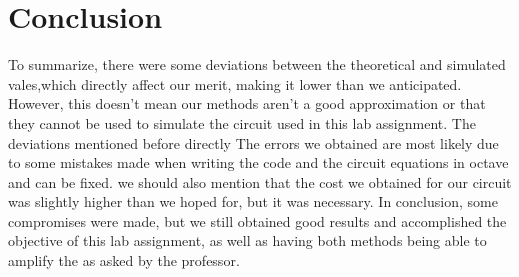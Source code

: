 \section{Conclusion}
\label{sec:conclusion}
To summarize, there were some deviations between the theoretical and simulated vales,which directly affect our merit, making it lower than we anticipated. However, this doesn't mean our methods aren't a good approximation or that they cannot be used to simulate the circuit used in this lab assignment. The deviations mentioned before directly The errors we obtained are most likely due to some mistakes made when writing the code and the circuit equations in octave and can be fixed.
we should also mention that the cost we obtained for our circuit was slightly higher than we hoped for, but it was necessary.
In conclusion, some compromises were made, but we still obtained good results and accomplished the objective of this lab assignment, as well as having both methods being able to amplify the as asked by the professor.